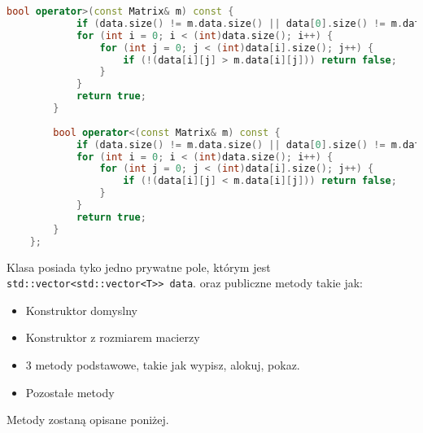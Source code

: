\begin{lstlisting}[caption=Klasa \texttt{Matrix}, label={lst:matrixclass}, language=C++]
		bool operator>(const Matrix& m) const {
			if (data.size() != m.data.size() || data[0].size() != m.data[0].size()) return false;
			for (int i = 0; i < (int)data.size(); i++) {
				for (int j = 0; j < (int)data[i].size(); j++) {
					if (!(data[i][j] > m.data[i][j])) return false;
				}
			}
			return true;
		}
		
		bool operator<(const Matrix& m) const {
			if (data.size() != m.data.size() || data[0].size() != m.data[0].size()) return false;
			for (int i = 0; i < (int)data.size(); i++) {
				for (int j = 0; j < (int)data[i].size(); j++) {
					if (!(data[i][j] < m.data[i][j])) return false;
				}
			}
			return true;
		}
	};
\end{lstlisting}
  
Klasa posiada tyko jedno prywatne pole, którym jest \texttt{std::vector<std::vector<T>> data}. oraz publiczne metody takie jak:
\begin{itemize}
	\item Konstruktor domyslny
	\item Konstruktor z rozmiarem macierzy
	\item 3 metody podstawowe, takie jak wypisz, alokuj, pokaz.
	\item Pozostałe metody
\end{itemize}
Metody zostaną opisane poniżej.

